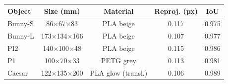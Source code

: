 \begin{tabular}{lcccc}
\toprule
Object & Size (mm) & Material & Reproj. (px) & IoU \\
\midrule
Bunny-S & 86$\times$67$\times$83 & PLA beige & 0.117 & 0.975 \\
Bunny-L & 173$\times$134$\times$166 & PLA beige & 0.107 & 0.977 \\
PI2 & 140$\times$100$\times$48 & PLA beige & 0.115 & 0.986 \\
P1 & 100$\times$70$\times$33 & PETG grey & 0.113 & 0.981 \\
Caesar & 122$\times$135$\times$200 & PLA glow (transl.) & 0.106 & 0.989 \\
\bottomrule
\end{tabular}
